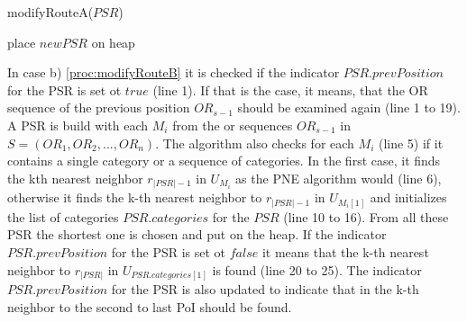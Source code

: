 \begin{procedure}[H]
	\label{proc:modifyRouteA}
	\caption{modifyRouteA($PSR$)}
		
	place $newPSR$ on heap\;
\end{procedure}

\pagebreak


In case b) \ref{proc:modifyRouteB} it is checked if the indicator $PSR.prevPosition$ for the PSR is set ot $true$ (line 1). If that is the case, it means, that the OR sequence of the previous position $OR_{s-1}$ should be examined again (line 1 to 19). A PSR is build with each $M_i$ from the or sequences $OR_{s-1}$ in $S = (OR_1, OR_2, ..., OR_n)$. The algorithm also checks for each $M_i$ (line 5) if it contains a single category or a sequence of categories. In the first case, it finds the kth nearest neighbor $r_{|PSR|-1}$ in $U_{M_{i}}$ as the PNE algorithm would (line 6), otherwise it finds the k-th nearest neighbor to $r_{|PSR|-1}$ in $U_{M_i[1]}$ and initializes the list of categories $PSR.categories$ for the $PSR$ (line 10 to 16). From all these PSR the shortest one is chosen and put on the heap. 
If the indicator $PSR.prevPosition$ for the PSR is set ot $false$  it means that the k-th nearest neighbor to $r_{|PSR|}$ in $U_{PSR.categories[1]}$ is found (line 20 to 25). The indicator $PSR.prevPosition$ for the PSR is also updated to indicate that in  the k-th neighbor to the second to last PoI should be found. \newline

